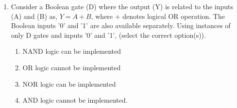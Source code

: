 \begin{enumerate}
\item Consider a Boolean gate (D) where the output (Y) is related to the inputs (A) and (B) as, $Y = A + B$, where + denotes logical OR operation. The Boolean inputs '0' and '1' are also available separately. Using instances of only D gates and inputs '0' and '1', (select the correct option(s)).
\begin{enumerate}
\item  NAND logic can be implemented

\item  OR logic cannot be implemented

\item  NOR logic can be implemented

\item  AND logic cannot be implemented.
\end{enumerate}
\end{enumerate}
